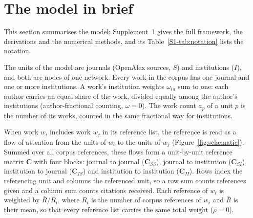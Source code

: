 \section{The model in brief}
\label{sec:networks}

This section summarises the model; Supplement~1 gives the full framework, the derivations and the numerical methods, and its Table~\ref{S1-tab:notation} lists the notation.

The units of the model are journals (OpenAlex sources, $S$) and institutions ($I$), and both are nodes of one network. Every work in the corpus has one journal and one or more institutions. A work's institution weights $\omega_{iu}$ sum to one: each author carries an equal share of the work, divided equally among the author's institutions (author-fractional counting, $\omega=0$). The work count $a_p$ of a unit $p$ is the number of its works, counted in the same fractional way for institutions.

When work $w_i$ includes work $w_j$ in its reference list, the reference is read as a flow of attention from the units of $w_i$ to the units of $w_j$ (Figure~\ref{fig:schematic}). Summed over all corpus references, these flows form a unit-by-unit reference matrix $\mathbf{C}$ with four blocks: journal to journal ($\mathbf{C}_{SS}$), journal to institution ($\mathbf{C}_{SI}$), institution to journal ($\mathbf{C}_{IS}$) and institution to institution ($\mathbf{C}_{II}$). Rows index the referencing unit and columns the referenced unit, so a row sum counts references given and a column sum counts citations received. Each reference of $w_i$ is weighted by $\bar{R}/R_i$, where $R_i$ is the number of corpus references of $w_i$ and $\bar{R}$ is their mean, so that every reference list carries the same total weight ($\rho=0$).

